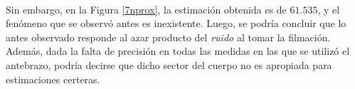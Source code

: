 \documentclass[12pt, twocolumn]{article}
\begin{document}
	\paragraph{} Sin embargo, en la Figura \ref{7nprox}, la estimación obtenida es de $61.535$, y el fenómeno que se observó antes es inexistente. Luego, se podría concluir que lo antes observado responde al azar producto del \textit{ruido} al tomar la filmación. Además, dada la falta de precisión en todas las medidas en las que se utilizó el antebrazo, podría decirse que dicho sector del cuerpo no es apropiada para estimaciones certeras.
	
	
	
\end{document}
